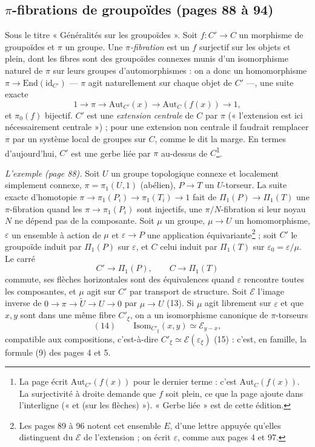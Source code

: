 \documentclass[11pt,a4paper]{article}
\begin{document}
\subsection*{$\pi$-fibrations de groupoïdes (pages 88 à 94)}

Sous le titre « Généralités sur les groupoïdes ». Soit $f : C' \to C$ un
morphisme de groupoïdes et $\pi$ un groupe. Une \emph{$\pi$-fibration} est un
$f$ surjectif sur les objets et plein, dont les fibres sont des groupoïdes
connexes munis d'un isomorphisme naturel de $\pi$ sur leurs groupes
d'automorphismes : on a donc un homomorphisme $\pi \to
\mathrm{End}(\mathrm{id}_{C'})$ — $\pi$ agit naturellement sur chaque objet
de $C'$ —, une suite exacte
\[
1 \to \pi \to \mathrm{Aut}_{C'}(x) \to \mathrm{Aut}_{C}(f(x)) \to 1,
\]
et $\pi_0(f)$ bijectif. $C'$ est une \emph{extension centrale} de $C$ par
$\pi$ (« l'extension est ici nécessairement centrale ») ; pour une extension
non centrale il faudrait remplacer $\pi$ par un système local de groupes sur
$C$, comme le dit la marge. En termes d'aujourd'hui, $C'$ est une gerbe liée
par $\pi$ au-dessus de $C$\footnote{La page écrit
$\mathrm{Aut}_{C'}(f(x))$ pour le dernier terme : c'est
$\mathrm{Aut}_C(f(x))$. La surjectivité à droite demande que $f$ soit plein,
ce que la page ajoute dans l'interligne (« et (sur les flèches) »). « Gerbe
liée » est de cette édition.}.

\emph{L'exemple (page 88).} Soit $U$ un groupe topologique connexe et
localement simplement connexe, $\pi = \pi_1(U, 1)$ (abélien), $P \to T$ un
$U$-torseur. La suite exacte d'homotopie $\pi \to \pi_1(P_i) \to \pi_1(T_i) \to
1$ fait de $\Pi_1(P) \to \Pi_1(T)$ une $\pi$-fibration quand les $\pi \to
\pi_1(P_i)$ sont injectifs, une $\pi/N$-fibration si leur noyau $N$ ne dépend
pas de la composante. Soit $\mu$ un groupe, $\mu \to U$ un homomorphisme,
$\varepsilon$ un ensemble à action de $\mu$ et $\varepsilon \to P$ une
application équivariante\footnote{Les pages 89 à 96 notent cet ensemble $E$,
d'une lettre appuyée qu'elles distinguent du $\mathcal{E}$ de l'extension ; on
écrit $\varepsilon$, comme aux pages 4 et 97.} ; soit $C'$ le groupoïde induit
par $\Pi_1(P)$ sur $\varepsilon$, et $C$ celui induit par $\Pi_1(T)$ sur
$\varepsilon_0 = \varepsilon/\mu$. Le carré
\[
C' \to \Pi_1(P), \qquad C \to \Pi_1(T)
\]
commute, ses flèches horizontales sont des équivalences quand $\varepsilon$
rencontre toutes les composantes, et $\mu$ agit sur $C'$ par transport de
structure. Soit $\mathcal{E}$ l'image inverse de $0 \to \pi \to \widetilde{U}
\to U \to 0$ par $\mu \to U$ (13). Si $\mu$ agit librement sur $\varepsilon$
et que $x, y$ sont dans une même fibre $C'_\xi$, on a un isomorphisme
canonique de $\pi$-torseurs
\[
(14)\qquad \mathrm{Isom}_{C'_\xi}(x, y) \simeq \mathcal{E}_{y - x},
\]
compatible aux compositions, c'est-à-dire $C'_\xi \simeq
\mathcal{E}(\varepsilon_\xi)$ (15) : c'est, en famille, la formule (9) des
pages 4 et 5.
\end{document}
